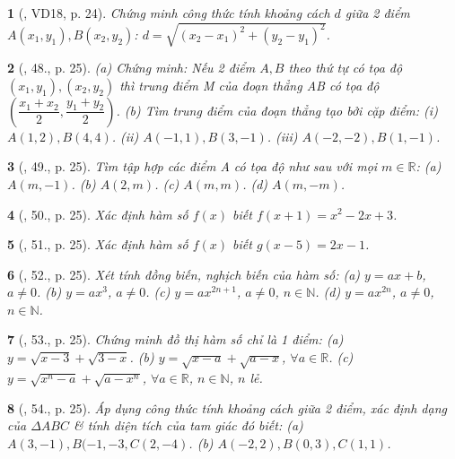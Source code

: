 \documentclass{article}
\newtheorem{baitoan}{}
\begin{document}
\begin{baitoan}[\cite{Binh_Toan_9_tap_1}, VD18, p. 24]
	Chứng minh công thức tính khoảng cách $d$ giữa 2 điểm $A(x_1,y_1),B(x_2,y_2)$: $d = \sqrt{(x_2 - x_1)^2 + (y_2 - y_1)^2}$.
\end{baitoan}

\begin{baitoan}[\cite{Binh_Toan_9_tap_1}, 48., p. 25]
	(a) Chứng minh: Nếu 2 điểm $A,B$ theo thứ tự có tọa độ $(x_1,y_1),(x_2,y_2)$ thì trung điểm M của đoạn thẳng AB có tọa độ $\left(\dfrac{x_1 + x_2}{2},\dfrac{y_1 + y_2}{2}\right)$. (b) Tìm trung điểm của đoạn thẳng tạo bởi cặp điểm: (i) $A(1,2),B(4,4)$. (ii) $A(-1,1),B(3,-1)$. (iii) $A(-2,-2),B(1,-1)$.
\end{baitoan}

\begin{baitoan}[\cite{Binh_Toan_9_tap_1}, 49., p. 25]
	Tìm tập hợp các điểm A có tọa độ như sau với mọi $m\in\mathbb{R}$: (a) $A(m,-1)$. (b) $A(2,m)$. (c) $A(m,m)$. (d) $A(m,-m)$.
\end{baitoan}

\begin{baitoan}[\cite{Binh_Toan_9_tap_1}, 50., p. 25]
	Xác định hàm số $f(x)$ biết $f(x + 1) = x^2 - 2x + 3$.
\end{baitoan}

\begin{baitoan}[\cite{Binh_Toan_9_tap_1}, 51., p. 25]
	Xác định hàm số $f(x)$ biết $g(x - 5) = 2x - 1$.
\end{baitoan}

\begin{baitoan}[\cite{Binh_Toan_9_tap_1}, 52., p. 25]
	Xét tính đồng biến, nghịch biến của hàm số: (a) $y = ax + b$, $a\ne0$. (b) $y = ax^3$, $a\ne0$. (c) $y = ax^{2n + 1}$, $a\ne0$, $n\in\mathbb{N}$. (d) $y = ax^{2n}$, $a\ne0$, $n\in\mathbb{N}$.
\end{baitoan}

\begin{baitoan}[\cite{Binh_Toan_9_tap_1}, 53., p. 25]
	Chứng minh đồ thị hàm số chỉ là 1 điểm: (a) $y = \sqrt{x - 3} + \sqrt{3 - x}$. (b) $y = \sqrt{x - a} + \sqrt{a - x}$, $\forall a\in\mathbb{R}$. (c) $y = \sqrt{x^n - a} + \sqrt{a - x^n}$, $\forall a\in\mathbb{R}$, $n\in\mathbb{N}$, $n$ lẻ.
\end{baitoan}

\begin{baitoan}[\cite{Binh_Toan_9_tap_1}, 54., p. 25]
	Áp dụng công thức tính khoảng cách giữa 2 điểm, xác định dạng của $\Delta ABC$ \& tính diện tích của tam giác đó biết: (a) $A(3,-1),B(-1,-3,C(2,-4)$. (b) $A(-2,2),B(0,3),C(1,1)$.
\end{baitoan}
\end{document}
